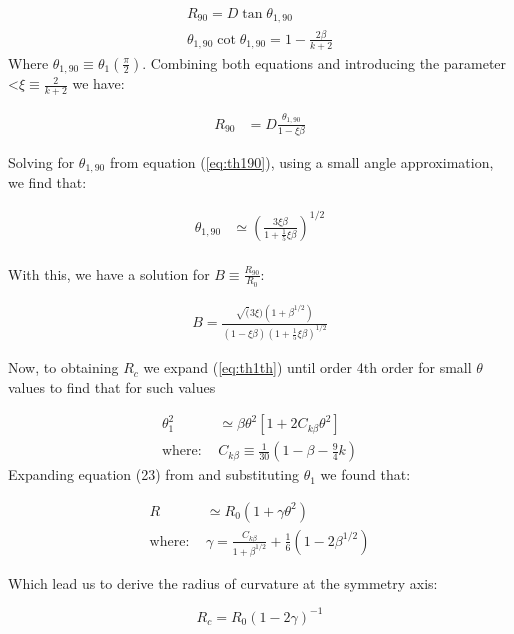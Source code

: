\begin{align}
R_{90} = D\tan\theta_{1,90} \\
\theta_{1,90}\cot\theta_{1,90} = 1-\frac{2\beta}{k+2} \label{eq:th190}
\end{align}
Where $\theta_{1,90}\equiv \theta_1(\frac{\pi}{2})$. Combining both equations and  introducing the parameter 
<$\xi\equiv \frac{2}{k+2}$ we have:

\begin{align}
R_{90} &= D\frac{\theta_{1,90}}{1-\xi\beta} 
\end{align}


Solving for $\theta_{1,90}$ from equation (\ref{eq:th190}), using a small angle  approximation, we find that:

\begin{align}
\theta_{1,90} &\simeq \left(\frac{3\xi\beta}{1+\frac{1}{5}\xi\beta}\right)^{1/2} \\
\label{eq:th190sol}
\end{align}

With this, we have a solution for $B \equiv \frac{R_{90}}{R_0}$:

\begin{align}
B = \frac{\sqrt(3\xi)\left(1+\beta^{1/2}\right)}{(1-\xi\beta)\left(1+\frac{1}{5}\xi\beta\right)^{1/2}}
\label{eq:B}
\end{align}

Now, to obtaining $R_c$ we expand  (\ref{eq:th1th}) until order 4th order for small $\theta$ values to find that for such values

\begin{align}
\theta_1^2 &\simeq \beta\theta^2\left[1+ 2C_{k\beta}\theta^2\right] \\
\mathrm{where:~} & C_{k\beta} \equiv \frac{1}{30}\left(1-\beta-\frac{9}{4}k\right)
\end{align}
Expanding equation (23) from \citep{Canto:1996} and substituting $\theta_1$ we found that:

\begin{align}
R &\simeq R_0 \left(1+\gamma\theta^2\right)
\label{eq:R_approx} \\
\mathrm{where:~} & \gamma = \frac{C_{k\beta}}{1+\beta^{1/2}}+\frac{1}{6}(1-2\beta^{1/2})
\end{align}

Which lead us to derive the radius of curvature at the symmetry axis:

\begin{equation}
R_c = R_0\left(1-2\gamma\right)^{-1}
\label{eq:Rcurv}
\end{equation}

